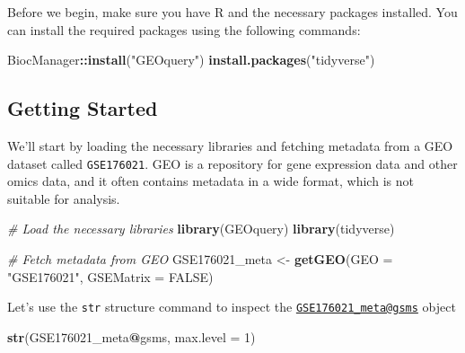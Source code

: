 \documentclass[
]{book}
\newenvironment{Shaded}{\begin{snugshade}}{\end{snugshade}}
\newcommand{\AttributeTok}[1]{\textcolor[rgb]{0.13,0.29,0.53}{#1}}
\newcommand{\CommentTok}[1]{\textcolor[rgb]{0.56,0.35,0.01}{\textit{#1}}}
\newcommand{\ConstantTok}[1]{\textcolor[rgb]{0.56,0.35,0.01}{#1}}
\newcommand{\DecValTok}[1]{\textcolor[rgb]{0.00,0.00,0.81}{#1}}
\newcommand{\FunctionTok}[1]{\textcolor[rgb]{0.13,0.29,0.53}{\textbf{#1}}}
\newcommand{\NormalTok}[1]{#1}
\newcommand{\OtherTok}[1]{\textcolor[rgb]{0.56,0.35,0.01}{#1}}
\newcommand{\SpecialCharTok}[1]{\textcolor[rgb]{0.81,0.36,0.00}{\textbf{#1}}}
\newcommand{\StringTok}[1]{\textcolor[rgb]{0.31,0.60,0.02}{#1}}
\begin{document}
Before we begin, make sure you have R and the necessary packages installed. You can install the required packages using the following commands:

\begin{Shaded}
\begin{Highlighting}[]
\NormalTok{BiocManager}\SpecialCharTok{::}\FunctionTok{install}\NormalTok{(}\StringTok{"GEOquery"}\NormalTok{)}
\FunctionTok{install.packages}\NormalTok{(}\StringTok{"tidyverse"}\NormalTok{)}
\end{Highlighting}
\end{Shaded}

\hypertarget{getting-started}{%
\subsection{Getting Started}\label{getting-started}}

We'll start by loading the necessary libraries and fetching metadata from a GEO dataset called \texttt{GSE176021}. GEO is a repository for gene expression data and other omics data, and it often contains metadata in a wide format, which is not suitable for analysis.

\begin{Shaded}
\begin{Highlighting}[]
\CommentTok{\# Load the necessary libraries}
\FunctionTok{library}\NormalTok{(GEOquery)}
\FunctionTok{library}\NormalTok{(tidyverse)}

\CommentTok{\# Fetch metadata from GEO}
\NormalTok{GSE176021\_meta }\OtherTok{\textless{}{-}} \FunctionTok{getGEO}\NormalTok{(}\AttributeTok{GEO =} \StringTok{"GSE176021"}\NormalTok{, }\AttributeTok{GSEMatrix =} \ConstantTok{FALSE}\NormalTok{)}
\end{Highlighting}
\end{Shaded}

Let's use the \texttt{str} structure command to inspect the \href{mailto:GSE176021_meta@gsms}{\nolinkurl{GSE176021\_meta@gsms}} object

\begin{Shaded}
\begin{Highlighting}[]
\FunctionTok{str}\NormalTok{(GSE176021\_meta}\SpecialCharTok{@}\NormalTok{gsms, }\AttributeTok{max.level =} \DecValTok{1}\NormalTok{)}
\end{Highlighting}
\end{Shaded}
\end{document}
